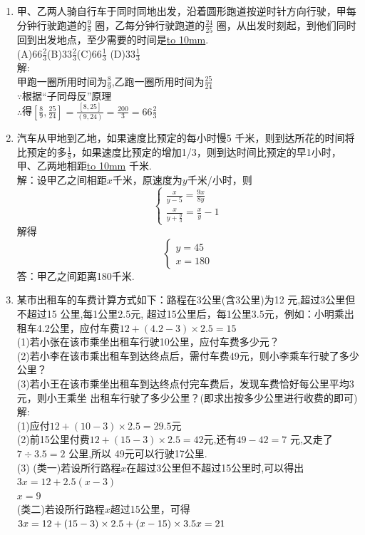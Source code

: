 \documentclass[12pt,oneside,a4paper]{ctexbook} %
\numberwithin{chapter}{part}
\begin{document}
\begin{enumerate}
\item 
甲、乙两人骑自行车于同时同地出发，沿着圆形跑道按逆时针方向行驶，甲每分钟行驶跑道的$\frac{9}{8}$ 圈，乙每分钟行驶跑道的$\frac{24}{25}$ 圈，从出发时刻起，到他们同时回到出发地点，至少需要的时间是\underline{\hbox to 10mm{}}.\\
 (A)$66\frac{2}{3}$\qquad(B)$33\frac{2}{3}$\qquad(C)$66\frac{1}{3}$
 \qquad(D)$33\frac{1}{3}$\\
解:\\
甲跑一圈所用时间为$\frac{8}{9}$,乙跑一圈所用时间为$\frac{25}{24}$\\
$\because$根据“子同母反”原理\\
$\therefore$得$[\frac{8}{9},\frac{25}{24}]=\frac{[8,25]}{(9,24)}=\frac{200}{3}=66\frac{2}{3}$

\item 
汽车从甲地到乙地，如果速度比预定的每小时慢5 千米，则到达所花的时间将比预定的多$\frac{1}{8}$，如果速度比预定的增加1/3，则到达时间比预定的早1小时，甲、乙两地相距\underline{\hbox to 10mm{}} 千米.\\
解：设甲乙之间相距$x$千米，原速度为$y$千米/小时，则
\begin{equation}
  \left\{
   \begin{array}{c}
\frac{x}{y-5}=\frac{9x}{8y}\\
\frac{x}{y+\frac{y}{3}}=\frac{x}{y}-1
   \end{array}
   \right.
\end{equation}
解得
\begin{equation}
\left\{
\begin{array}{c}
y=45\\
x=180
\end{array}
\right.
\end{equation}
答：甲乙之间距离180千米.

\item 
某市出租车的车费计算方式如下：路程在3公里(含3公里)为12 元,超过3公里但不超过15 公里,每1公里2.5元,
超过15公里后，每1公里3.5元，例如：小明乘出租车4.2公里，应付车费$12+(4.2-3)\times2.5=15$\\
(1)若小张在该市乘坐出租车行驶10公里，应付车费多少元？\\
(2)若小李在该市乘出租车到达终点后，需付车费49元，则小李乘车行驶了多少公里？\\
(3)若小王在该市乘坐出租车到达终点付完车费后，发现车费恰好每公里平均3元，则小王乘坐
出租车行驶了多少公里？(即求出按多少公里进行收费的即可)\\
解:\\
(1)应付$12+(10-3)\times2.5=29.5$元\\
(2)前15公里付费$12+(15-3)\times2.5=42$元,还有$49-42=7$ 元,又走了$7\div3.5=2$ 公里,所以
49元可以行驶17公里.\\
(3)
(类一)若设所行路程$x$在超过3公里但不超过15公里时,可以得出\\
$3x=12+2.5(x-3)$\\
$x=9$\\
(类二)若设所行路程$x$超过15公里，可得\\
$3x=12+(15-3)\times2.5+(x-15)\times3.5\\
x=21$


\end{enumerate}
\end{document}
